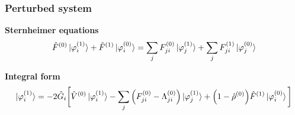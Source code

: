 \begin{frame}
\end{frame}

\begin{frame}
    \frametitle{Perturbed system}
    \centering
    \textbf{Sternheimer equations}
    \begin{equation}
        \nonumber
        \hat{F}^{(0)}\ket{\varphi_i^{(1)}} +
        \hat{F}^{(1)}\ket{\varphi_i^{(0)}} =
        \sum_j F_{ji}^{(0)}\ket{\varphi_j^{(1)}} + 
        \sum_j F_{ji}^{(1)}\ket{\varphi_j^{(0)}}
    \end{equation}

    \vspace{5mm}

    \centering
    \textbf{Integral form}
    \begin{equation}
        \nonumber
        \ket{\varphi_i^{(1)}} = -2\hat{G}_i\bigg[
        \hat{V}^{(0)}\ket{\varphi_i^{(1)}} -
        \sum_j \Big(F^{(0)}_{ji} - \Lambda^{(0)}_{ji}\Big)
        \ket{\varphi_j^{(1)}} +
        \Big(1 - \hat{\rho}^{(0)}\Big)
        \hat{F}^{(1)}\ket{\varphi_i^{(0)}}
        \bigg]
    \end{equation}
\end{frame}


